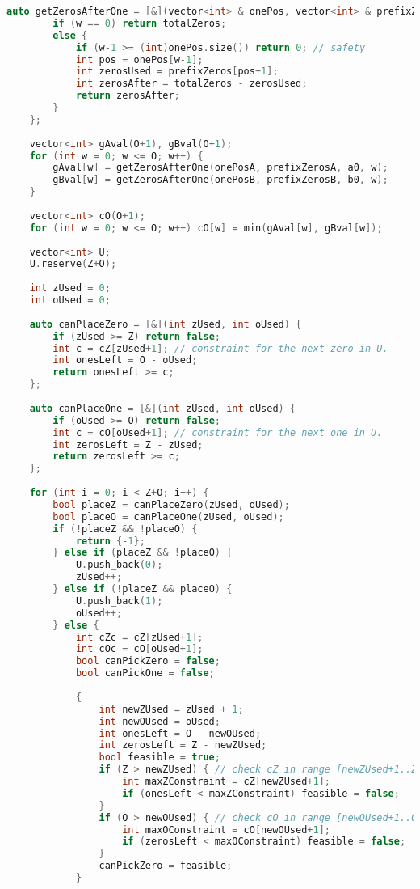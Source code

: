 \begin{lstlisting}[language=C++]
    auto getZerosAfterOne = [&](vector<int> & onePos, vector<int> & prefixZeros, int totalZeros, int w) {
        if (w == 0) return totalZeros;
        else {
            if (w-1 >= (int)onePos.size()) return 0; // safety
            int pos = onePos[w-1];
            int zerosUsed = prefixZeros[pos+1];
            int zerosAfter = totalZeros - zerosUsed;
            return zerosAfter;
        }
    };
 
    vector<int> gAval(O+1), gBval(O+1);
    for (int w = 0; w <= O; w++) {
        gAval[w] = getZerosAfterOne(onePosA, prefixZerosA, a0, w);
        gBval[w] = getZerosAfterOne(onePosB, prefixZerosB, b0, w);
    }
 
    vector<int> cO(O+1);
    for (int w = 0; w <= O; w++) cO[w] = min(gAval[w], gBval[w]);
 
    vector<int> U;
    U.reserve(Z+O);
 
    int zUsed = 0;
    int oUsed = 0;
 
    auto canPlaceZero = [&](int zUsed, int oUsed) {
        if (zUsed >= Z) return false;
        int c = cZ[zUsed+1]; // constraint for the next zero in U.
        int onesLeft = O - oUsed;
        return onesLeft >= c;
    };
 
    auto canPlaceOne = [&](int zUsed, int oUsed) {
        if (oUsed >= O) return false;
        int c = cO[oUsed+1]; // constraint for the next one in U.
        int zerosLeft = Z - zUsed;
        return zerosLeft >= c;
    };
 
    for (int i = 0; i < Z+O; i++) {
        bool placeZ = canPlaceZero(zUsed, oUsed);
        bool placeO = canPlaceOne(zUsed, oUsed);
        if (!placeZ && !placeO) {
            return {-1};
        } else if (placeZ && !placeO) {
            U.push_back(0);
            zUsed++;
        } else if (!placeZ && placeO) {
            U.push_back(1);
            oUsed++;
        } else {
            int cZc = cZ[zUsed+1];
            int cOc = cO[oUsed+1];
            bool canPickZero = false;
            bool canPickOne = false;
 
            {
                int newZUsed = zUsed + 1;
                int newOUsed = oUsed;
                int onesLeft = O - newOUsed;
                int zerosLeft = Z - newZUsed;
                bool feasible = true;
                if (Z > newZUsed) { // check cZ in range [newZUsed+1..Z]
                    int maxZConstraint = cZ[newZUsed+1];
                    if (onesLeft < maxZConstraint) feasible = false;
                }
                if (O > newOUsed) { // check cO in range [newOUsed+1..O]
                    int maxOConstraint = cO[newOUsed+1];
                    if (zerosLeft < maxOConstraint) feasible = false;
                }
                canPickZero = feasible;
            }
 

\end{lstlisting}
